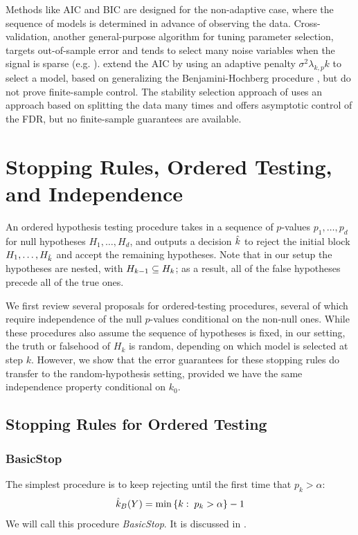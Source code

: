 \documentclass{article}
\begin{document}
Methods like AIC \citet{akaike1974new} and BIC \citep{schwarz1978estimating} are designed for the non-adaptive case, where the sequence of models is determined in advance of observing the data. Cross-validation, another general-purpose algorithm for tuning parameter selection, targets out-of-sample error and tends to select many noise variables when the signal is sparse (e.g. \cite{LY2015}).   \citet{benjamini2009simple} extend the AIC by using an adaptive penalty $\sigma^2\lambda_{k,p} k$ to select a model, based on generalizing the Benjamini-Hochberg procedure \citet{benjamini1995controlling}, but do not prove finite-sample control. The stability selection approach of \citet{meinshausen2010stability} uses an approach based on splitting the data many times and offers asymptotic control of the FDR, but no finite-sample guarantees are available.

\section{Stopping Rules, Ordered Testing, and Independence}

An ordered hypothesis testing procedure takes in a sequence of $p$-values $p_1, \ldots, p_d$ for null hypotheses $H_{1}, \ldots, H_{d}$, and outputs a decision $\hat{k}$ to reject the initial block $H_{1}, \ldots, H_{\hat{k}}$ and accept the remaining hypotheses. Note that in our setup the hypotheses are nested, with $H_{k-1} \subseteq H_k$; as a result, all of the false hypotheses precede all of the true ones.

We first review several proposals for ordered-testing procedures, several of which require independence of the null $p$-values conditional on the non-null ones. While these procedures also assume the sequence of hypotheses is fixed, in our setting, the truth or falsehood of $H_k$ is random, depending on which model is selected at step $k$. However, we show that the error guarantees for these stopping rules do transfer to the random-hypothesis setting, provided we have the same independence property conditional on $k_0$.

\subsection{Stopping Rules for Ordered Testing}
\label{sec:orderedProposals}

\subsubsection{BasicStop}
The simplest procedure is to keep rejecting until the first time that $p_k > \alpha$: 
\[
\hat{k}_B(Y) = \min\left\{k:\; p_k > \alpha\right\} - 1
\]
We will call this procedure {\em BasicStop}. It is discussed in \citet{marcus1976}.
\end{document}

